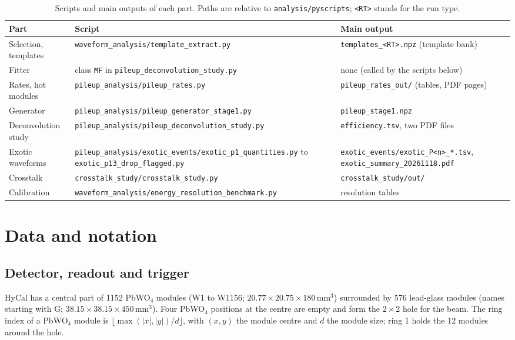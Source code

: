 \documentclass[11pt]{article}
\newcommand{\code}[1]{\texttt{#1}}
\begin{document}
\begin{table}[htbp]
\centering
\caption{Scripts and main outputs of each part. Paths are relative to \code{analysis/pyscripts}; \code{<RT>} stands for the run type.}
\label{tab:scripts}
\small
\begin{tabular}{lp{}p{}}
\toprule
Part & Script & Main output \\
\midrule
Selection, templates & \code{waveform\_analysis/template\_extract.py} & \code{templates\_<RT>.npz} (template bank) \\
Fitter & class \code{MF} in \code{pileup\_deconvolution\_study.py} & none (called by the scripts below) \\
Rates, hot modules & \code{pileup\_analysis/pileup\_rates.py} & \code{pileup\_rates\_out/} (tables, PDF pages) \\
Generator & \code{pileup\_analysis/pileup\_generator\_stage1.py} & \code{pileup\_stage1.npz} \\
Deconvolution study & \code{pileup\_analysis/pileup\_deconvolution\_study.py} & \code{efficiency.tsv}, two PDF files \\
Exotic waveforms & \code{pileup\_analysis/exotic\_events/exotic\_p1\_quantities.py} to \code{exotic\_p13\_drop\_flagged.py} & \code{exotic\_events/exotic\_P<n>\_*.tsv}, \code{exotic\_summary\_20261118.pdf} \\
Crosstalk & \code{crosstalk\_study/crosstalk\_study.py} & \code{crosstalk\_study/out/} \\
Calibration & \code{waveform\_analysis/energy\_resolution\_benchmark.py} & resolution tables \\
\bottomrule
\end{tabular}
\end{table}

\section{Data and notation}
\label{sec:data}

\subsection{Detector, readout and trigger}
\label{sec:detector}

HyCal has a central part of 1152 PbWO$_4$ modules (W1 to W1156; $20.77 \times 20.75 \times 180$\,mm$^3$) surrounded by 576 lead-glass modules (names starting with G; $38.15 \times 38.15 \times 450$\,mm$^3$). Four PbWO$_4$ positions at the centre are empty and form the $2 \times 2$ hole for the beam. The ring index of a PbWO$_4$ module is $\lfloor \max(|x|, |y|)/d \rfloor$, with $(x, y)$ the module centre and $d$ the module size; ring 1 holds the 12 modules around the hole.
\end{document}
